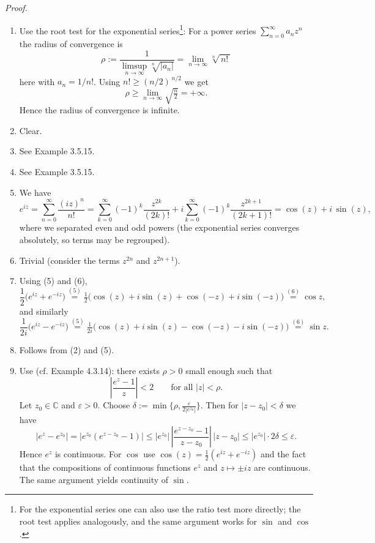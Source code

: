 \documentclass[12pt]{article}
\begin{document}
\emph{Proof.}
\begin{enumerate}[label=({\arabic*})]
	\item Use the root test for the exponential series\footnote{For the exponential series one can also use the ratio test more directly; the root test applies analogously, and the same argument works for $\sin$ and $\cos$.}:
	For a power series $\sum_{n=0}^{\infty} a_n z^n$ the radius of convergence is
	\[
		\rho 
		:= \frac{1}{\limsup\limits_{n\to\infty} \sqrt[n]{|a_n|}}
		= \lim_{n\to\infty} \sqrt[n]{\,n!\,}
	\]
	here with $a_n = 1/n!$. Using $n! \ge (n/2)^{\,n/2}$ we get
	\[
		\rho \ge \lim_{n\to\infty} \sqrt{\tfrac{n}{2}} = +\infty.
	\]
	Hence the radius of convergence is infinite.
		\item Clear.
		\item See Example 3.5.15.
		\item See Example 3.5.15.
		\item We have
		\[
			e^{iz} = \sum_{n=0}^{\infty} \frac{(iz)^n}{n!}
			= \sum_{k=0}^{\infty} (-1)^k \frac{z^{2k}}{(2k)!}
				+ i \sum_{k=0}^{\infty} (-1)^k \frac{z^{2k+1}}{(2k+1)!}
			= \cos(z) + i\,\sin(z),
		\]
		where we separated even and odd powers (the exponential series converges absolutely, so terms may be regrouped).
		\item Trivial (consider the terms $z^{2n}$ and $z^{2n+1}$).
		\item Using (5) and (6),
		\[
				\frac{1}{2}\bigl(e^{iz}+e^{-iz}\bigr)
				\stackrel{(5)}{=} \tfrac{1}{2}\bigl(\cos(z)+i\sin(z) + \cos(-z)+i\sin(-z)\bigr)
				\stackrel{(6)}{=} \cos z,
		\]
		and similarly
		\[
				\frac{1}{2i}\bigl(e^{iz}-e^{-iz}\bigr)
				\stackrel{(5)}{=} \tfrac{1}{2i}\bigl(\cos(z)+i\sin(z) - \cos(-z)-i\sin(-z)\bigr)
				\stackrel{(6)}{=} \sin z.
		\]
		\item Follows from (2) and (5).
		\item Use (cf. Example 4.3.14): there exists $\rho>0$ small enough such that
		\[
			\left|\frac{e^{z}-1}{z}\right| < 2 \qquad \text{for all } |z|<\rho.
		\]
		Let $z_0\in\mathbb C$ and $\varepsilon>0$. Choose $\delta := \min\{\rho, \tfrac{\varepsilon}{2|e^{z_0}|}\}$. Then for $|z-z_0|<\delta$ we have
		\[
			|e^{z} - e^{z_0}| = |e^{z_0}(e^{z-z_0}-1)| \le |e^{z_0}|\,\left|\frac{e^{z-z_0}-1}{z-z_0}\right|\,|z-z_0|
			\le |e^{z_0}|\cdot 2\delta \le \varepsilon.
		\]
		Hence $e^{z}$ is continuous. For $\cos$ use $\cos(z)=\tfrac{1}{2}(e^{iz}+e^{-iz})$ and the fact that the compositions of continuous functions $e^{z}$ and $z\mapsto\pm i z$ are continuous. The same argument yields continuity of $\sin$.
\end{enumerate}
\end{document}
